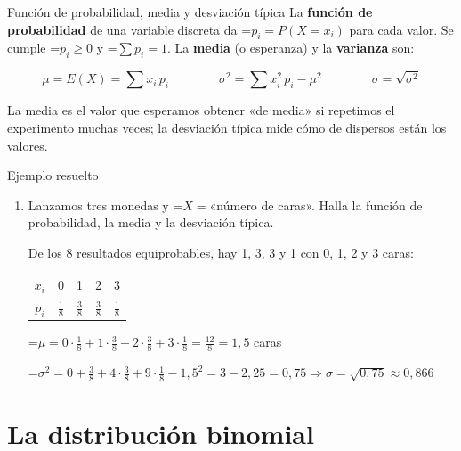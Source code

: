 \documentclass[11pt,a4paper]{article}
\newcommand{\fmm}[1]{\setbox0=\hbox{$#1$}\ifdim\wd0>\linewidth\[#1\]\else\mbox{\box0}\fi}
\begin{document}
  
\begin{fmdef}{Función de probabilidad, media y desviación típica}
La \textbf{función de probabilidad} de una variable discreta da \fmm{p_i=P(X=x_i)} para cada valor. Se cumple \fmm{p_i\geq0} y \fmm{\sum p_i=1}. La \textbf{media} (o esperanza) y la \textbf{varianza} son:

      
\[\mu=E(X)=\sum x_i\,p_i\qquad\qquad\sigma^2=\sum x_i^2\,p_i-\mu^2\qquad\qquad\sigma=\sqrt{\sigma^2}\]

      

La media es el valor que esperamos obtener «de media» si repetimos el experimento muchas veces; la desviación típica mide cómo de dispersos están los valores.
\end{fmdef}

  
\begin{fmex}{Ejemplo resuelto}
\begin{enumerate}[label=\textbf{\arabic*.},leftmargin=*]
\item Lanzamos tres monedas y \fmm{X=}«número de caras». Halla la función de probabilidad, la media y la desviación típica.
          

            

De los 8 resultados equiprobables, hay 1, 3, 3 y 1 con 0, 1, 2 y 3 caras:

              
\begin{center}\renewcommand{\arraystretch}{1.5}\begin{tabular}{ccccc}\toprule
$x_i$ & 0 & 1 & 2 & 3\\
$p_i$ & $\frac18$ & $\frac38$ & $\frac38$ & $\frac18$\\
\bottomrule\end{tabular}\end{center}

            

\fmm{\mu=0\cdot\frac18+1\cdot\frac38+2\cdot\frac38+3\cdot\frac18=\frac{12}{8}=1{,}5} caras

            

\fmm{\sigma^2=0+\frac38+4\cdot\frac38+9\cdot\frac18-1{,}5^2=3-2{,}25=0{,}75\Rightarrow\sigma=\sqrt{0{,}75}\approx0{,}866}
\end{enumerate}
\end{fmex}

\section{La distribución binomial}\hypertarget{sec2}{}
\end{document}
